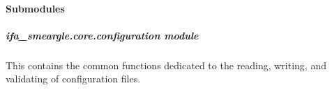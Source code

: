 \documentclass[letterpaper,10pt,english]{sphinxmanual}
\begin{document}
\paragraph{Submodules}
\label{\detokenize{docstrings/ifa_smeargle.core:submodules}}

\subparagraph{ifa\_smeargle.core.configuration module}
\label{\detokenize{docstrings/ifa_smeargle.core.configuration:module-ifa_smeargle.core.configuration}}\label{\detokenize{docstrings/ifa_smeargle.core.configuration:ifa-smeargle-core-configuration-module}}\label{\detokenize{docstrings/ifa_smeargle.core.configuration::doc}}
This contains the common functions dedicated to the reading,
writing, and validating of configuration files.
\end{document}
